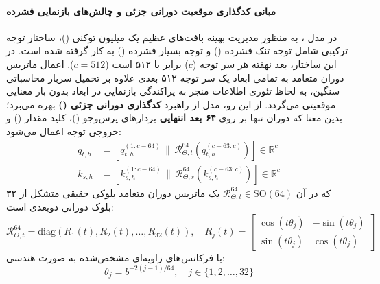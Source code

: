 \item {}

\paragraph*{مبانی کدگذاری موقعیت دورانی جزئی و چالش‌های بازنمایی فشرده}
در مدل  \cite{deepseek2026v4}، به منظور مدیریت بهینه بافت‌های عظیم یک میلیون توکنی ()، ساختار توجه ترکیبی شامل توجه تنک فشرده () و توجه بسیار فشرده () به کار گرفته شده است. در این ساختار، بعد نهفته هر سر توجه ($c$) برابر با ۵۱۲ است ($c = 512$). اعمال ماتریس دوران متعامد به تمامی ابعاد یک سر توجه ۵۱۲ بعدی علاوه بر تحمیل سربار محاسباتی سنگین، به لحاظ تئوری اطلاعات منجر به پراکندگی بازنمایی در ابعاد بدون بار معنایی موقعیتی می‌گردد. از این رو، مدل از راهبرد \textbf{کدگذاری دورانی جزئی ()} \cite{su2024roformer} بهره می‌برد؛ بدین معنا که دوران تنها بر روی \textbf{۶۴ بعد انتهایی} بردارهای پرس‌وجو ()، کلید-مقدار () و خروجی توجه اعمال می‌شود:
\begin{equation}
\begin{split}
    q_{t, h} &= \left[ q_{t, h}^{(1:c-64)} \,\|\, \mathcal{R}_{\Theta, t}^{64} \left( q_{t, h}^{(c-63:c)} \right) \right] \in \mathbb{R}^c \\
    k_{s, h} &= \left[ k_{s, h}^{(1:c-64)} \,\|\, \mathcal{R}_{\Theta, s}^{64} \left( k_{s, h}^{(c-63:c)} \right) \right] \in \mathbb{R}^c
\end{split}
\end{equation}
که در آن $\mathcal{R}_{\Theta, t}^{64} \in \text{SO}(64)$ یک ماتریس دوران متعامد بلوکی حقیقی متشکل از ۳۲ بلوک دورانی دوبعدی است:
\begin{equation}
    \mathcal{R}_{\Theta, t}^{64} = \text{diag}\left( R_1(t), R_2(t), \dots, R_{32}(t) \right), \quad R_j(t) = \begin{bmatrix} \cos(t\theta_j) & -\sin(t\theta_j) \\ \sin(t\theta_j) & \cos(t\theta_j) \end{bmatrix}
\end{equation}
با فرکانس‌های زاویه‌ای مشخص‌شده به صورت هندسی:
\begin{equation}
    \theta_j = b^{-2(j-1)/64}, \quad j \in \{1, 2, \dots, 32\}
\end{equation}

